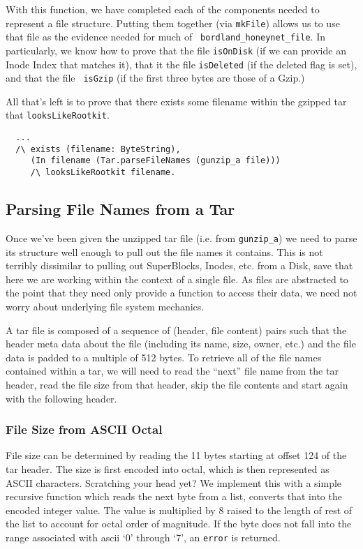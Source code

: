 \documentclass[nocopyrightspace]{sigplanconf}
\begin{document}
With this function, we have completed each of the components needed to
represent a file structure. Putting them together (via {\tt mkFile}) allows us
to use that file as the evidence needed for much of {\tt
bordland\_honeynet\_file}. In particularly, we know how to prove that the file
{\tt isOnDisk} (if we can provide an Inode Index that matches it), that it the
file {\tt isDeleted} (if the deleted flag is set), and that the file {\tt
isGzip} (if the first three bytes are those of a Gzip.)

All that's left is to prove that there exists some filename within the gzipped
tar that {\tt looksLikeRootkit}.

\begin{lstlisting}
  ...
  /\ exists (filename: ByteString),
     (In filename (Tar.parseFileNames (gunzip_a file)))
     /\ looksLikeRootkit filename.
\end{lstlisting}

\subsection{Parsing File Names from a Tar}
Once we've been given the unzipped tar file (i.e. from {\tt gunzip\_a}) we
need to parse its structure well enough to pull out the file names it
contains. This is not terribly dissimilar to pulling out SuperBlocks, Inodes,
etc. from a Disk, save that here we are working within the context of a single
file. As files are abstracted to the point that they need only provide a
function to access their data, we need not worry about underlying file system
mechanics.

A tar file is composed of a sequence of (header, file content) pairs such that
the header meta data about the file (including its name, size, owner, etc.)
and the file data is padded to a multiple of 512 bytes. To retrieve all of the
file names contained within a tar, we will need to read the ``next'' file name
from the tar header, read the file size from that header, skip the file
contents and start again with the following header.

\subsubsection{File Size from ASCII Octal}
File size can be determined by reading the 11 bytes starting at offset 124 of
the tar header. The size is first encoded into octal, which is then
represented as ASCII characters. Scratching your head yet? We implement this
with a simple recursive function which reads the next byte from a list,
converts that into the encoded integer value. The value is multiplied by 8
raised to the length of rest of the list to account for octal order of
magnitude. If the byte does not fall into the range associated with ascii `0'
through `7', an {\tt error} is returned.
\end{document}
